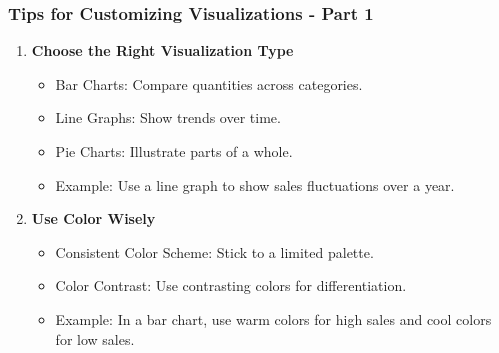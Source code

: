 \documentclass[aspectratio=169]{beamer}
\begin{document}
\begin{frame}[fragile]
    \frametitle{Tips for Customizing Visualizations - Part 1}
    \begin{enumerate}
        \item \textbf{Choose the Right Visualization Type}
            \begin{itemize}
                \item Bar Charts: Compare quantities across categories.
                \item Line Graphs: Show trends over time.
                \item Pie Charts: Illustrate parts of a whole.
                \item Example: Use a line graph to show sales fluctuations over a year.
            \end{itemize}

        \item \textbf{Use Color Wisely}
            \begin{itemize}
                \item Consistent Color Scheme: Stick to a limited palette.
                \item Color Contrast: Use contrasting colors for differentiation.
                \item Example: In a bar chart, use warm colors for high sales and cool colors for low sales.
            \end{itemize}
    \end{enumerate}
\end{frame}
\end{document}
